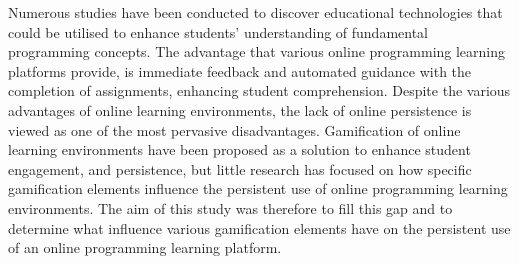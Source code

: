 Numerous studies have been conducted to discover educational technologies that could be utilised to enhance students’ understanding of fundamental programming
concepts. The advantage that various online programming
learning platforms provide, is immediate feedback and
automated guidance with the completion of assignments,
enhancing student comprehension. Despite the various
advantages of online learning environments, the lack of online
persistence is viewed as one of the most pervasive disadvantages.
Gamification of online learning environments have been
proposed as a solution to enhance student engagement, and
persistence, but little research has focused on how specific
gamification elements influence the persistent use of online
programming learning environments. The aim of this study was
therefore to fill this gap and to determine what influence various
gamification elements have on the persistent use of an online
programming learning platform.
